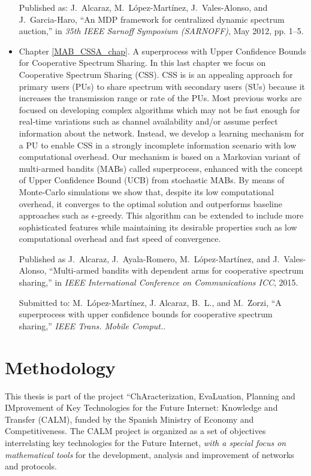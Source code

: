 \begin{itemize}
Published as: J.~Alcaraz, M.~L\'{o}pez-Mart\'{i}nez, J.~Vales-Alonso, and J.~Garcia-Haro, ``An {MDP}
  framework for centralized dynamic spectrum auction,'' in \emph{35th {IEEE}
  Sarnoff Symposium ({SARNOFF})}, May 2012, pp. 1--5.
\item Chapter \ref{MAB_CSSA_chap}. A superprocess with Upper Confidence Bounds for Cooperative Spectrum Sharing. In this last chapter we focus on Cooperative Spectrum Sharing (CSS). CSS is is an appealing approach for primary users (PUs) to share spectrum with secondary users (SUs) because it increases the transmission range or rate of the PUs. Most previous works are focused on developing complex algorithms which may not be fast enough for real-time variations such as channel availability and/or assume perfect information about the network. Instead, we develop a learning mechanism for a PU to enable CSS in a strongly incomplete information scenario with low computational overhead. Our mechanism is based on a Markovian variant of multi-armed bandits (MABs) called superprocess, enhanced with the concept of Upper Confidence Bound (UCB) from stochastic MABs. By means of Monte-Carlo simulations we show that, despite its low computational overhead, it converges to the optimal solution and outperforms baseline approaches such as $\epsilon$-greedy. This algorithm can be extended to include more sophisticated features while maintaining its desirable properties such as low computational overhead and fast speed of convergence. 

Published as J.~Alcaraz, J.~Ayala-Romero, M.~L\'{o}pez-Mart\'{i}nez, and J.~Vales-Alonso,
  ``Multi-armed bandits with dependent arms for cooperative spectrum sharing,''
  in \emph{{IEEE} International Conference on Communications {ICC}}, 2015.

Submitted to: M.~L\'{o}pez-Mart\'{i}nez, J. Alcaraz, B.~L., and M.~Zorzi, ``A superprocess with
  upper confidence bounds for cooperative spectrum sharing,'' \emph{{IEEE}
  Trans. Mobile Comput.}.
\end{itemize}

\section{Methodology}
This thesis is part of the project “ChAracterization, EvaLuation, Planning and IMprovement of Key Technologies for the Future Internet: Knowledge and Transfer (CALM), funded by the Spanish Ministry of Economy and Competitiveness. 
The CALM project is organized as a set of objectives interrelating key technologies for the Future Internet, \emph{with a special focus on mathematical tools} for the development, analysis and improvement of networks and protocols.

